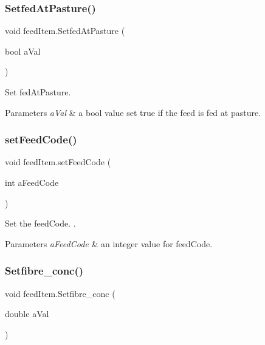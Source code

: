 \subsubsection{\texorpdfstring{SetfedAtPasture()}{SetfedAtPasture()}}
{\footnotesize\ttfamily void feed\+Item.\+Setfed\+At\+Pasture (\begin{DoxyParamCaption}\item[{bool}]{a\+Val }\end{DoxyParamCaption})\hspace{0.3cm}{\ttfamily [inline]}}



Set fed\+At\+Pasture. 


\begin{DoxyParams}{Parameters}
{\em a\+Val} & a bool value set true if the feed is fed at pasture. \\
\hline
\end{DoxyParams}
\mbox{\label{classfeed_item_a005d6dd8e2c2cb5a7ddf4f904690daf6}} 
\subsubsection{\texorpdfstring{setFeedCode()}{setFeedCode()}}
{\footnotesize\ttfamily void feed\+Item.\+set\+Feed\+Code (\begin{DoxyParamCaption}\item[{int}]{a\+Feed\+Code }\end{DoxyParamCaption})\hspace{0.3cm}{\ttfamily [inline]}}



Set the feed\+Code. . 


\begin{DoxyParams}{Parameters}
{\em a\+Feed\+Code} & an integer value for feed\+Code. \\
\hline
\end{DoxyParams}
\mbox{\label{classfeed_item_ab4acc78c49603c114df456a30b74ecba}} 
\subsubsection{\texorpdfstring{Setfibre\_conc()}{Setfibre\_conc()}}
{\footnotesize\ttfamily void feed\+Item.\+Setfibre\+\_\+conc (\begin{DoxyParamCaption}\item[{double}]{a\+Val }\end{DoxyParamCaption})\hspace{0.3cm}{\ttfamily [inline]}}



